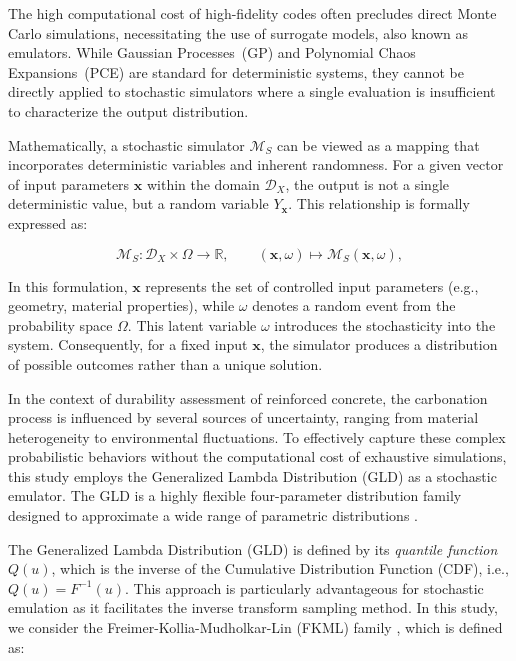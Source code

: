 The high computational cost of high-fidelity codes often precludes direct Monte Carlo simulations, necessitating the use of surrogate models, also known as emulators. While Gaussian Processes~(GP) and Polynomial Chaos Expansions~(PCE) are standard for deterministic systems, they cannot be directly applied to stochastic simulators where a single evaluation is insufficient to characterize the output distribution.

Mathematically, a stochastic simulator $\mathcal{M}_S$ can be viewed as a mapping that incorporates deterministic variables and inherent randomness. For a given vector of input parameters $\mathbf{x}$ within the domain $\mathcal{D}_X$, the output is not a single deterministic value, but a random variable $Y_{\mathbf{x}}$. This relationship is formally expressed as:

\begin{equation}\mathcal{M}_S : \mathcal{D}_X \times \Omega \rightarrow \mathbb{R}, \qquad(\mathbf{x}, \omega) \mapsto \mathcal{M}_S(\mathbf{x}, \omega),\end{equation}

In this formulation, $\mathbf{x}$ represents the set of controlled input parameters (e.g., geometry, material properties), while $\omega$ denotes a random event from the probability space $\Omega$. This latent variable $\omega$ introduces the stochasticity into the system. Consequently, for a fixed input $\mathbf{x}$, the simulator produces a distribution of possible outcomes rather than a unique solution.

In the context of durability assessment of reinforced concrete, the carbonation process is influenced by several sources of uncertainty, ranging from material heterogeneity to environmental fluctuations. To effectively capture these complex probabilistic behaviors without the computational cost of exhaustive simulations, this study employs the Generalized Lambda Distribution (GLD) as a stochastic emulator. The GLD is a highly flexible four-parameter distribution family designed to approximate a wide range of parametric distributions \cite{KarianDudewicz2000, ZhuSudret2020-GLAMoriginal}.

The Generalized Lambda Distribution (GLD) is defined by its \textit{quantile function} $Q(u)$, which is the inverse of the Cumulative Distribution Function (CDF), i.e., $Q(u) = F^{-1}(u)$. This approach is particularly advantageous for stochastic emulation as it facilitates the inverse transform sampling method. In this study, we consider the Freimer-Kollia-Mudholkar-Lin (FKML) family \cite{Freimer1988}, which is defined as:

